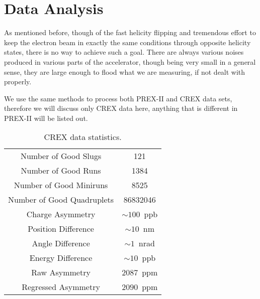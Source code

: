 \chapter{Data Analysis}
As mentioned before, though of the fast helicity flipping and tremendous effort to keep 
the electron beam in exactly the same conditions through opposite helicity states, 
there is no way to achieve such a goal. There are always various noises produced
in various parts of the accelerator, though being very small in a general sense, 
they are large enough to flood what we are measuring, if not dealt with properly.  

We use the same methods to process both PREX-II and CREX data sets, therefore we will
discuss only CREX data here, anything that is different in PREX-II will be listed
out.

\begin{table}
    \centering
    \begin{tabular}{c | c}
	\hline
	Number of Good Slugs	    & 121   \\
	Number of Good Runs	    & 1384  \\
	Number of Good Miniruns	    & 8525  \\
	Number of Good Quadruplets  & 86832046  \\
	\hline
	Charge Asymmetry    & $\sim 100$~ppb	\\
	Position Difference & $\sim 10$~nm  \\
	Angle Difference    & $\sim 1$~nrad \\
	Energy Difference   & $\sim 10$~ppb \\
	\hline	    
	Raw Asymmetry	    & $2087$~ppm    \\
	Regressed Asymmetry & $2090$~ppm    \\
	\hline
    \end{tabular}
    \caption{CREX data statistics.}
\end{table}


